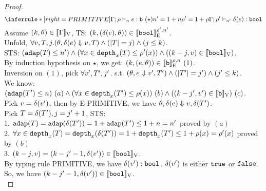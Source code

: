 \documentclass[a4paper,11pt]{article}
\theoremstyle{definition}
\begin{document}
\begin{proof}
\[
    \inferrule*[right = PRIMITIVE]{
      \Gamma; \dmap \tvdash{\nnatA} \expr: \tbase ~ (\star) \\
      \nnatA' = 1 + \nnatA \\
      \dmap' = 1 + \dmap
    }{
      \Gamma; \dmap' \tvdash{\nnatA'} \eop(\expr): \tbool
    }
\]
Assume $(k, \theta) \in [\![ \Gamma ]\!]_{\text{V}}$, TS: $(k, (\delta(e), \theta)) \in [\![ \mathtt{bool} ]\!]_{\text{E}}^{\rho', n'}$.\\
%
Unfold, $\forall v, T, j. (\theta, \delta(e) \mathrel{\Downarrow} v, T) \land (|T| = j) \land (j \leq k)$.\\
%
STS: $(\mathtt{adap}(T) \leq n') \land (\forall x \in \mathtt{depth}_{x}(T) \leq \rho'(x)) \land ((k - j, v) \in [\![ \mathtt{bool} ]\!]_{\text{V}})$.\\
%
By induction hypothesis on $\star$, we get: $(k, (e, \theta)) \in [\![ \mathtt{b} ]\!]_{\text{E}}^{\rho, n} ~ (1)$.\\
%
Inversion on $(1)$, pick $\forall v', T', j'$. s.t. $ (\theta, e \mathrel{\Downarrow} v', T') \land (|T'| = j') \land (j' \leq k)$.\\
%
We know: $(\mathtt{adap}(T') \leq n) ~ (a)
\land (\forall x \in \mathtt{depth}_{x}(T') \leq \rho(x)) ~ (b)
\land ((k - j', v') \in [\![ \mathtt{b} ]\!]_{\text{V}}) ~ (c)$.\\
%
Pick $v = \delta(v')$, then by E-PRIMITIVE, we have $\theta, \delta(e) \mathrel{\Downarrow} v, \delta(T')$.\\
%
Pick $T = \delta(T'), j = j' + 1$, STS:\\
%
1. $\mathtt{adap}(T) = \mathtt{adap}(\delta(T')) = 1 + \mathtt{adap}(T') \leq 1 + n = n'$ proved by $(a)$\\
%
2. $\forall x \in \mathtt{depth}_{x}(T) = \mathtt{depth}_{x}(\delta(T')) = 1 + \mathtt{depth}_{x}(T') \leq 1 + \rho(x) = \rho'(x)$ proved by $(b)$\\
%
3. $(k - j, v) = (k - j' - 1, \delta(v')) \in [\![ \mathtt{bool} ]\!]_{\text{V}} $.\\
%
By typing rule PRIMITIVE, we have $\delta(v'): \mathtt{bool}$. $\delta(v')$ is either $\mathtt{true}$ or $\mathtt{false}$. So, we have $(k - j' - 1, \delta(v')) \in [\![ \mathtt{bool} ]\!]_{\text{V}}$.\\
%




\end{proof}
\end{document}
